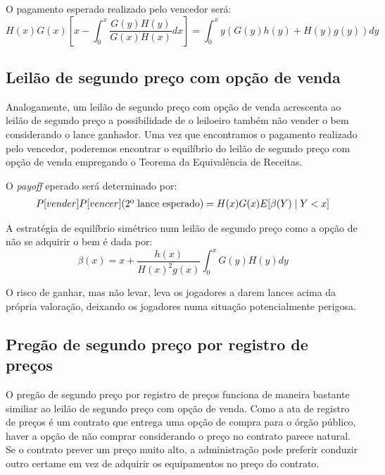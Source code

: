 O pagamento esperado realizado pelo vencedor será:
\begin{equation}
	H(x)G(x) \left[ x - \int_0^x \frac{G(y)H(y)}{G(x)H(x)}dx \right] = \int_0^x y(G(y)h(y)+H(y)g(y)) dy
\end{equation}

\subsection{Leilão de segundo preço com opção de venda}

Analogamente, um leilão de segundo preço com opção de venda acrescenta ao leilão de segundo preço a possibilidade de o leiloeiro também não vender o bem considerando o lance ganhador. Uma vez que encontramos o pagamento realizado pelo vencedor, poderemos encontrar o equilíbrio do leilão de segundo preço com opção de venda empregando o Teorema da Equivalência de Receitas.

O \emph{payoff} eperado será determinado por:
\begin{align*}
	P[vender]P[vencer](\text{2{\textordmasculine } lance esperado}) = H(x)G(x)E[\beta(Y) \mid Y<x]
\end{align*}

\begin{proposicao}
	\label{prop:nash-segundo-preco-opcao}
	A estratégia de equilíbrio simétrico num leilão de segundo preço como a opção de não se adquirir o bem é dada por:
	\begin{equation}
		\beta(x) = x + \frac{h(x)}{H(x)^2 g(x)} \int_0^x G(y)H(y)dy
	\end{equation}
\end{proposicao}

O risco de ganhar, mas não levar, leva os jogadores a darem lances acima da própria valoração, deixando os jogadores numa situação potencialmente perigosa.

\subsection{Pregão de segundo preço por registro de preços}

O pregão de segundo preço por registro de preços funciona de maneira bastante similiar ao leilão de segundo preço com opção de venda. Como a ata de registro de preços é um contrato que entrega uma opção de compra para o órgão público, haver a opção de não comprar considerando o preço no contrato parece natural. Se o contrato prever um preço muito alto, a administração pode preferir conduzir outro certame em vez de adquirir os equipamentos no preço do contrato.

